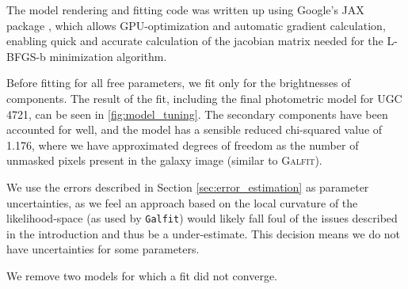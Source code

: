 \documentclass[../main.tex]{subfiles}
\begin{document}
The model rendering and fitting code was written up using Google's JAX package \citep{jax2018github}, which allows GPU-optimization and automatic gradient calculation, enabling quick and accurate calculation of the jacobian matrix needed for the L-BFGS-b minimization algorithm.

Before fitting for all free parameters, we fit only for the brightnesses of components. The result of the fit, including the final photometric model for UGC 4721, can be seen in \ref{fig:model_tuning}. The secondary components have been accounted for well, and the model has a sensible reduced chi-squared value of 1.176, where we have approximated degrees of freedom as the number of unmasked pixels present in the galaxy image (similar to \textsc{Galfit}).

\begin{figure*}
  \caption{Effect of fitting on the aggregated models. The top left panel shows an Arcsinh-scaled image of the galaxy being fit (UGC 4721), the top middle shows the final model obtained (with the same limits and scaling as the galaxy image) and the top right shows the difference between the two images, in units of pixel uncertainty. The bottom panels show a simple representation of the model before and after tuning, overlaid on the galaxy image from the top-left panel. With minimal change to the aggregated components, we recover a detailed model that matches the galaxy exceptionally well, as evident in the residuals.}
  \label{fig:model_tuning}
\end{figure*}

We use the errors described in Section \ref{sec:error_estimation} as parameter uncertainties, as we feel an approach based on the local curvature of the likelihood-space (as used by \texttt{Galfit}) would likely fall foul of the issues described in the introduction and thus be a under-estimate. This decision means we do not have uncertainties for some parameters.

We remove two models for which a fit did not converge.
\end{document}
